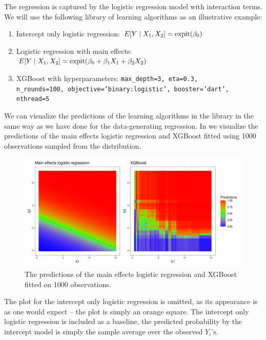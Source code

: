 \documentclass[./main.tex]{subfiles}
\begin{document}
The regression is captured by the logistic regression model with interaction terms. We will use the following library of learning algorithms as an illustrative example:
\begin{enumerate}
    \item Intercept only logistic regression: $E[Y \mid X_1, X_2] = \operatorname{expit}(\beta_0)$
    \item Logistic regression with main effects: $E[Y \mid X_1, X_2] = \operatorname{expit}(\beta_0 + \beta_1 X_1 + \beta_2 X_2)$
    \item XGBoost with hyperparameters: \texttt{max\_depth=3, eta=0.3,\\ n\_rounds=100, objective='binary:logistic', booster='dart', nthread=5}
\end{enumerate}
We can visualize the predictions of the learning algorithms in the library in the same way as we have done for the data-generating regression. In  we visualize the predictions of the main effects logistic regression and XGBoost fitted using 1000 observations sampled from the distribution. 
\begin{figure}
    \centering
    \includegraphics[width=\textwidth]{figures/predictpar.png}
    \caption{The predictions of the main effects logistic regression and XGBoost fitted on 1000 observations.}
    \label{fig:predictpar}
\end{figure}

The plot for the intercept only logistic regression is omitted, as its appearance is as one would expect -- the plot is simply an orange square. The intercept only logistic regression is included as a baseline, the predicted probability by the intercept model is simply the sample average over the observed $ Y_i$'s. 
\end{document}
